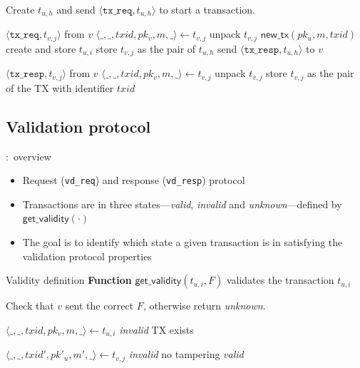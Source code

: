 \documentclass{beamer}
\begin{document}
\begin{frame}{\subsecname}
Create $t_{u, h}$ and send $\langle \texttt{tx\_req}, t_{u, h} \rangle$ to start a transaction.
\vspace{5 mm}
\begin{algorithmic}
    \Upon $\langle \texttt{tx\_req}, t_{v, j} \rangle$ from $v$
    \State $\langle \_, \_, txid, pk_v, m, \_ \rangle \gets t_{v, j}$ \Comment unpack $t_{v, j}$
    \State $\textsf{new\_tx}(pk_u, m, txid)$ \Comment create and store $t_{u, i}$
    \State store $t_{v, j}$ as the pair of $t_{u, h}$
    \State send $\langle \texttt{tx\_resp}, t_{u, h} \rangle$ to $v$

    \Upon $\langle \texttt{tx\_resp}, t_{v, j} \rangle$ from $v$  
    \State $\langle \_, \_, txid, pk_v, m, \_ \rangle \gets t_{v, j}$ \Comment unpack $t_{v, j}$
    \State store $t_{v, j}$ as the pair of the TX with identifier $txid$
\end{algorithmic}
\end{frame}

\subsection{Validation protocol}
\begin{frame}{\subsecname:~overview}
\begin{itemize}
\item Request (\texttt{vd\_req}) and response (\texttt{vd\_resp}) protocol
\item Transactions are in three states---\emph{valid}, \emph{invalid} and \emph{unknown}---defined by $\textsf{get\_validity}(\cdot)$
\item The goal is to identify which state a given transaction is in satisfying the validation protocol properties
\end{itemize}
\end{frame}

\begin{frame}{Validity definition}
\textbf{Function} $\textsf{get\_validity}(t_{u, i}, F)$ validates the transaction $t_{u, i}$
\vspace{5 mm}
\begin{algorithmic}
    \State Check that $v$ sent the correct $F$,
    otherwise return \emph{unknown}.

    \State
    \State $\langle \_, \_, txid, pk_v, m, \_ \rangle \gets t_{u, i}$
        \State \Return \emph{invalid}
    \EndIf
    \State \Comment TX exists 

    \State $\langle \_, \_, txid', pk'_u, m', \_ \rangle \gets t_{v, j}$
        \State \Return \emph{invalid}
    \EndIf
    \State \Comment no tampering
    \State \Return \emph{valid}
\end{algorithmic}
\end{frame}
\end{document}
